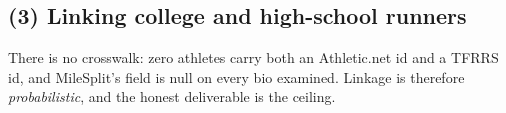 
\subsection{(3) Linking college and high-school runners}

There is no crosswalk: zero athletes carry both an Athletic.net id and a TFRRS id, and MileSplit's  field is null on every bio examined. Linkage is therefore \emph{probabilistic}, and the honest deliverable is the ceiling.

